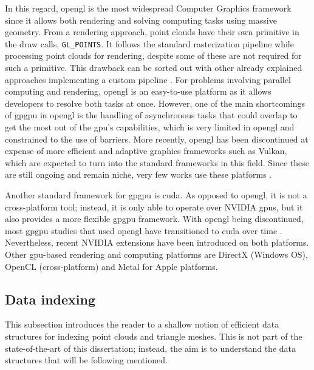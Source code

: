 In this regard, \acrshort{opengl} is the most widespread Computer Graphics framework since it allows both rendering and solving computing tasks using massive geometry. From a rendering approach, point clouds have their own primitive in the draw calls, \verb|GL_POINTS|. It follows the standard rasterization pipeline while processing point clouds for rendering, despite some of these are not required for such a primitive. This drawback can be sorted out with other already explained approaches implementing a custom pipeline \cite{schutz_rendering_2021, schutz_software_2022}. For problems involving parallel computing and rendering, \acrshort{opengl} is an easy-to-use platform as it allows developers to resolve both tasks at once. However, one of the main shortcomings of \acrshort{gpgpu} in \acrshort{opengl} is the handling of asynchronous tasks that could overlap to get the most out of the \acrshort{gpu}'s capabilities, which is very limited in \acrshort{opengl} and constrained to the use of barriers. More recently, \acrshort{opengl} has been discontinued at expense of more efficient and adaptive graphics frameworks such as Vulkan, which are expected to turn into the standard frameworks in this field. Since these are still ongoing and remain niche, very few works use these platforms \cite{stumpfegger_gpu_2022}.  

Another standard framework for \acrshort{gpgpu} is \acrshort{cuda}. As opposed to \acrshort{opengl}, it is not a cross-platform tool; instead, it is only able to operate over NVIDIA \acrshort{gpu}s, but it also provides a more flexible \acrshort{gpgpu} framework. With \acrshort{opengl} being discontinued, most \acrshort{gpgpu} studies that used \acrshort{opengl} have transitioned to \acrshort{cuda} over time \cite{schutz_gpu-accelerated_2023}. Nevertheless, recent NVIDIA extensions have been introduced on both platforms. Other \acrshort{gpu}-based rendering and computing platforms are DirectX \cite{baek_accelerated_2020} (Windows OS), OpenCL (cross-platform) and Metal for Apple platforms.

\subsection{Data indexing}

This subsection introduces the reader to a shallow notion of efficient data structures for indexing point clouds and triangle meshes. This is not part of the state-of-the-art of this dissertation; instead, the aim is to understand the data structures that will be following mentioned.

